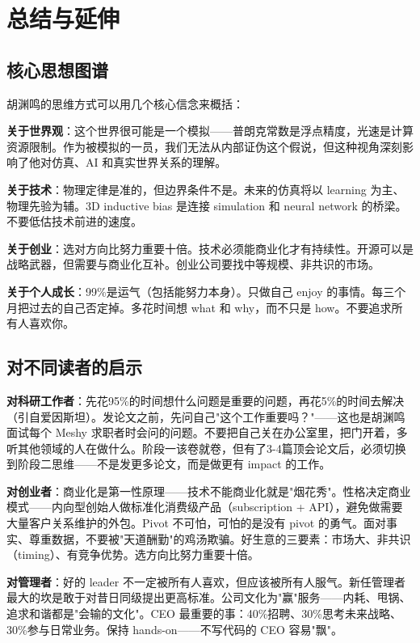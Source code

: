 \section{总结与延伸}

\subsection{核心思想图谱}

胡渊鸣的思维方式可以用几个核心信念来概括：

\textbf{关于世界观}：这个世界很可能是一个模拟——普朗克常数是浮点精度，光速是计算资源限制。作为被模拟的一员，我们无法从内部证伪这个假说，但这种视角深刻影响了他对仿真、AI 和真实世界关系的理解。

\textbf{关于技术}：物理定律是准的，但边界条件不是。未来的仿真将以 learning 为主、物理先验为辅。3D inductive bias 是连接 simulation 和 neural network 的桥梁。不要低估技术前进的速度。

\textbf{关于创业}：选对方向比努力重要十倍。技术必须能商业化才有持续性。开源可以是战略武器，但需要与商业化互补。创业公司要找中等规模、非共识的市场。

\textbf{关于个人成长}：99\%是运气（包括能努力本身）。只做自己 enjoy 的事情。每三个月把过去的自己否定掉。多花时间想 what 和 why，而不只是 how。不要追求所有人喜欢你。

\subsection{对不同读者的启示}

\textbf{对科研工作者}：先花95\%的时间想什么问题是重要的问题，再花5\%的时间去解决（引自爱因斯坦）。发论文之前，先问自己"这个工作重要吗？"——这也是胡渊鸣面试每个 Meshy 求职者时会问的问题。不要把自己关在办公室里，把门开着，多听其他领域的人在做什么。阶段一该卷就卷，但有了3-4篇顶会论文后，必须切换到阶段二思维——不是发更多论文，而是做更有 impact 的工作。

\textbf{对创业者}：商业化是第一性原理——技术不能商业化就是"烟花秀"。性格决定商业模式——内向型创始人做标准化消费级产品（subscription + API），避免做需要大量客户关系维护的外包。Pivot 不可怕，可怕的是没有 pivot 的勇气。面对事实、尊重数据，不要被"天道酬勤"的鸡汤欺骗。好生意的三要素：市场大、非共识（timing）、有竞争优势。选方向比努力重要十倍。

\textbf{对管理者}：好的 leader 不一定被所有人喜欢，但应该被所有人服气。新任管理者最大的坎是敢于对昔日同级提出更高标准。公司文化为"赢"服务——内耗、甩锅、追求和谐都是"会输的文化"。CEO 最重要的事：40\%招聘、30\%思考未来战略、30\%参与日常业务。保持 hands-on——不写代码的 CEO 容易"飘"。

